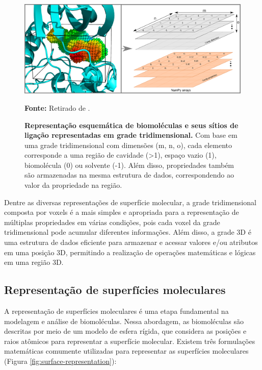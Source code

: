 \documentclass[Portugues]{phdquali}
\begin{document}
\begin{figure}[ht]
  \centerline{\includegraphics[scale=0.75]{images/voxels.png}}
  \centerline{\scriptsize{\textbf{Fonte:} Retirado de \cite{guerra2021}.}}
  \caption[Representação esquemática de biomoléculas e seus sítios de ligação representadas em grade tridimensional]{\textbf{Representação esquemática de biomoléculas e seus sítios de ligação representadas em grade tridimensional.} Com base em uma grade tridimensional com dimensões (m, n, o), cada elemento corresponde a uma região de cavidade (>1), espaço vazio (1), biomolécula (0) ou solvente (-1). Além disso, propriedades também são armazenadas na mesma estrutura de dados, correspondendo ao valor da propriedade na região.}
  \label{fig:voxel}
\end{figure}

Dentre as diversas representações de superfície molecular, a grade tridimensional composta por voxels é a mais simples e apropriada para a representação de múltiplas propriedades em várias condições, pois cada voxel da grade tridimensional pode acumular diferentes informações. Além disso, a grade 3D é uma estrutura de dados eficiente para armazenar e acessar valores e/ou atributos em uma posição 3D, permitindo a realização de operações matemáticas e lógicas em uma região 3D. 


\subsection{Representação de superfícies moleculares}

A representação de superfícies moleculares é uma etapa fundamental na modelagem e análise de biomoléculas. Nessa abordagem, as biomoléculas são descritas por meio de um modelo de esfera rígida, que considera as posições e raios atômicos para representar a superfície molecular. Existem três formulações matemáticas comumente utilizadas para representar as superfícies moleculares (Figura \ref{fig:surface-representation}):
\end{document}

